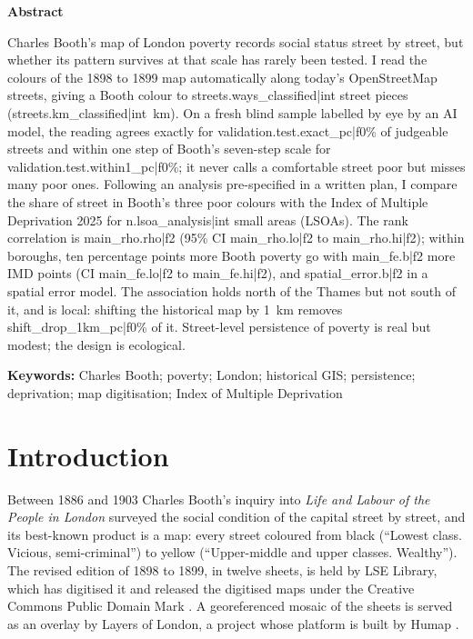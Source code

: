 \begin{center}\textbf{Abstract}\end{center}
Charles Booth's map of London poverty records social status street by street, but whether its pattern survives at that scale has rarely been tested. I read the colours of the 1898 to 1899 map automatically along today's OpenStreetMap streets, giving a Booth colour to {{streets.ways_classified|int}} street pieces ({{streets.km_classified|int}}~km). On a fresh blind sample labelled by eye by an AI model, the reading agrees exactly for {{validation.test.exact_pc|f0}}\% of judgeable streets and within one step of Booth's seven-step scale for {{validation.test.within1_pc|f0}}\%; it never calls a comfortable street poor but misses many poor ones. Following an analysis pre-specified in a written plan, I compare the share of street in Booth's three poor colours with the Index of Multiple Deprivation 2025 for {{n.lsoa_analysis|int}} small areas (LSOAs). The rank correlation is {{main_rho.rho|f2}} (95\% CI {{main_rho.lo|f2}} to {{main_rho.hi|f2}}); within boroughs, ten percentage points more Booth poverty go with {{main_fe.b|f2}} more IMD points (CI {{main_fe.lo|f2}} to {{main_fe.hi|f2}}), and {{spatial_error.b|f2}} in a spatial error model. The association holds north of the Thames but not south of it, and is local: shifting the historical map by 1~km removes {{shift_drop_1km_pc|f0}}\% of it. Street-level persistence of poverty is real but modest; the design is ecological.

\textbf{Keywords:} Charles Booth; poverty; London; historical GIS; persistence; deprivation; map digitisation; Index of Multiple Deprivation

\section{Introduction}

Between 1886 and 1903 Charles Booth's inquiry into \textit{Life and Labour of the People in London} surveyed the social condition of the capital street by street, and its best-known product is a map: every street coloured from black (``Lowest class. Vicious, semi-criminal'') to yellow (``Upper-middle and upper classes. Wealthy''). The revised edition of 1898 to 1899, in twelve sheets, is held by LSE Library, which has digitised it and released the digitised maps under the Creative Commons Public Domain Mark \citep{lse_about, lse_maps}. A georeferenced mosaic of the sheets is served as an overlay by Layers of London, a project whose platform is built by Humap \citep{humap}.

